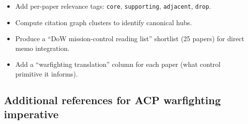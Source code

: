 \documentclass[
]{article}
\providecommand{\tightlist}{%
  \setlength{\itemsep}{0pt}\setlength{\parskip}{0pt}}
\begin{document}
\begin{itemize}
\tightlist
\item
  Add per-paper relevance tags: \texttt{core}, \texttt{supporting},
  \texttt{adjacent}, \texttt{drop}.
\item
  Compute citation graph clusters to identify canonical hubs.
\item
  Produce a ``DoW mission-control reading list'' shortlist (25 papers)
  for direct memo integration.
\item
  Add a ``warfighting translation'' column for each paper (what control
  primitive it informs).
\end{itemize}

\hypertarget{additional-references-for-acp-warfighting-imperative}{%
\subsection{Additional references for ACP warfighting
imperative}\label{additional-references-for-acp-warfighting-imperative}}
\end{document}
